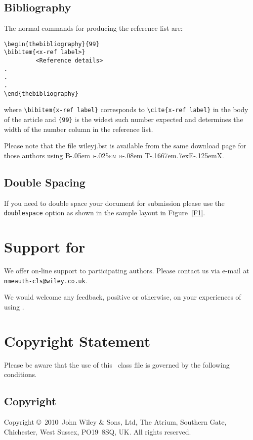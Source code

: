\documentclass[times]{nmeauth}
\newcommand\BibTeX{{\rmfamily B\kern-.05em \textsc{i\kern-.025em b}\kern-.08em
T\kern-.1667em\lower.7ex\hbox{E}\kern-.125emX}}
\def\volumeyear{2010}
\begin{document}
\subsection{Bibliography}
The normal commands for producing the reference list are:
\begin{verbatim}
\begin{thebibliography}{99}
\bibitem{<x-ref label>}
         <Reference details>
.
.
.
\end{thebibliography}
\end{verbatim}
where \verb"\bibitem{x-ref label}"
corresponds to \verb"\cite{x-ref label}" in the body of the article
and \verb"{99}" is the widest such number expected and determines
the width of the number column in the reference list.

Please note that the file \textsf{wileyj.bst} is available from
the same download page for those authors using \BibTeX.

\subsection{Double Spacing}
If you need to double space your document for submission please
use the \verb+doublespace+ option as shown in the sample layout in
Figure~\ref{F1}.

\section{Support for \textsf{\journalclass}}
We offer on-line support to participating authors. Please contact
us via e-mail at\\
\href{mailto:nmeauth-cls@wiley.co.uk}{\texttt{nmeauth-cls@wiley.co.uk}}.

We would welcome any feedback, positive or otherwise, on your
experiences of using \textsf{\journalclass}.

\section{Copyright Statement}
Please  be  aware that the use of  this \LaTeXe\ class file is
governed by the following conditions.

\subsection{Copyright}
Copyright \copyright\ \volumeyear\ John Wiley \& Sons, Ltd, The
Atrium, Southern Gate, Chichester, West Sussex, PO19~8SQ, UK. All
rights reserved.
\end{document}

